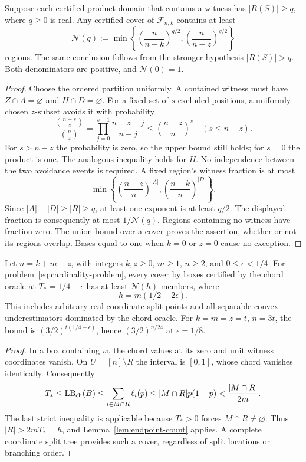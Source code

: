 \begin{lemma}\label{lem:endpoint-count}
Suppose each certified product domain that contains a witness has
$|R(S)|\ge q$, where $q\ge0$ is real. Any certified cover of
$\mathcal F_{n,k}$ contains at least
\begin{equation}\label{eq:cardinality-cover}
 \mathcal N(q):=
 \min\left\{\left(\frac n{n-k}\right)^{q/2},
                 \left(\frac n{n-z}\right)^{q/2}\right\}
\end{equation}
regions. The same conclusion follows from the stronger hypothesis
$|R(S)|>q$. Both denominators are positive, and $\mathcal N(0)=1$.
\end{lemma}
\begin{proof}
Choose the ordered partition uniformly. A contained witness must have
$Z\cap A=\varnothing$ and $H\cap D=\varnothing$. For a fixed set of
$s$ excluded positions, a uniformly chosen $z$-subset avoids it with
probability
\[
 \frac{\binom{n-s}{z}}{\binom nz}
 =\prod_{j=0}^{s-1}\frac{n-z-j}{n-j}
 \le\left(\frac{n-z}{n}\right)^s
 \quad(s\le n-z).
\]
For $s>n-z$ the probability is zero, so the upper bound still holds;
for $s=0$ the product is one. The analogous inequality holds for $H$.
No independence between the two avoidance events is required. A fixed
region's witness fraction is at most
\[
 \min\left\{\left(\frac{n-z}{n}\right)^{|A|},
               \left(\frac{n-k}{n}\right)^{|D|}\right\}.
\]
Since $|A|+|D|\ge |R|\ge q$, at least one exponent is at least $q/2$.
The displayed fraction is consequently at most $1/\mathcal N(q)$.
Regions containing no witness have fraction zero. The union bound over a
cover proves the assertion, whether or not its regions overlap. Bases
equal to one when $k=0$ or $z=0$ cause no exception.
\end{proof}

\begin{theorem}\label{thm:chord-cover}
Let $n=k+m+z$, with integers $k,z\ge0$, $m\ge1$, $n\ge2$, and
$0\le\epsilon<1/4$. For problem~\eqref{eq:cardinality-problem}, every
cover by boxes certified by the chord oracle at
$T_*=1/4-\epsilon$ has at least $\mathcal N(h)$ members, where
\begin{equation}\label{eq:chord-h}
 h=m(1/2-2\epsilon).
\end{equation}
This includes arbitrary real coordinate split points and all separable
convex underestimators dominated by the chord oracle. For
$k=m=z=t$, $n=3t$, the bound is
$(3/2)^{t(1/4-\epsilon)}$, hence $(3/2)^{n/24}$ at $\epsilon=1/8$.
\end{theorem}
\begin{proof}
In a box containing $w$, the chord values at its zero and unit witness
coordinates vanish. On $U=[n]\setminus R$ the interval is $[0,1]$,
whose chord vanishes identically. Consequently
\[
 T_*\le\operatorname{LB}_{\rm ch}(B)
 \le\sum_{i\in M\cap R}\ell_i(p)
 \le |M\cap R|p(1-p)<\frac{|M\cap R|}{2m}.
\]
The last strict inequality is applicable because $T_*>0$ forces
$M\cap R\ne\varnothing$. Thus $|R|>2mT_*=h$, and
Lemma~\ref{lem:endpoint-count} applies. A complete coordinate split tree
provides such a cover, regardless of split locations or branching order.
\end{proof}

